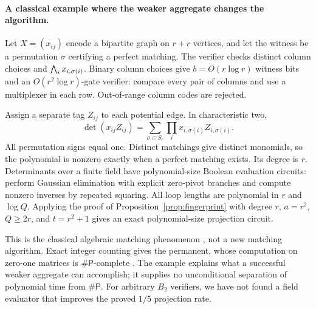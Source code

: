 \paragraph{A classical example where the weaker aggregate changes the algorithm.}
Let $X=(x_{ij})$ encode a bipartite graph on $r+r$ vertices, and let
the witness be a permutation $\sigma$ certifying a perfect matching.
The verifier checks distinct column choices and
$\bigwedge_i x_{i,\sigma(i)}$. Binary column choices give
$b=O(r\log r)$ witness bits and an $O(r^2\log r)$-gate verifier:
compare every pair of columns and use a multiplexer in each row.
Out-of-range column codes are rejected.

Assign a separate tag $Z_{ij}$ to each potential edge. In
characteristic two,
\[
 \det(x_{ij}Z_{ij})
   =\sum_{\sigma\in S_r}\prod_i x_{i,\sigma(i)}Z_{i,\sigma(i)}.
\]
All permutation signs equal one. Distinct matchings give distinct
monomials, so the polynomial is nonzero exactly when a perfect
matching exists. Its degree is $r$. Determinants over a finite field
have polynomial-size Boolean evaluation circuits: perform Gaussian
elimination with explicit zero-pivot branches and compute nonzero
inverses by repeated squaring. All loop lengths are polynomial in
$r$ and $\log Q$. Applying the proof of Proposition~\ref{prop:fingerprint}
with degree $r$, $a=r^2$, $Q\ge2r$, and $t=r^2+1$ gives an exact
polynomial-size projection circuit.

This is the classical algebraic matching phenomenon
\citep{MulmuleyVaziraniVazirani1987}, not a new matching algorithm.
Exact integer counting gives the permanent, whose computation on
zero-one matrices is $\#\mathsf P$-complete \citep{Valiant1979}.
The example explains what a successful weaker aggregate can accomplish;
it supplies no unconditional separation of polynomial time from
$\#\mathsf P$. For arbitrary $B_2$ verifiers, we have not found a
field evaluator that improves the proved $1/5$ projection rate.
